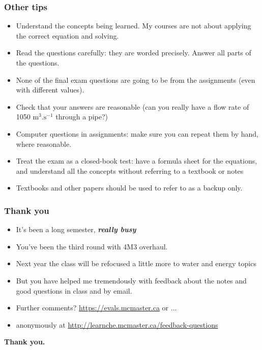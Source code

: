 \begin{frame}\frametitle{Other tips}
	\begin{itemize}
		\item	Understand the concepts being learned. My courses are not about applying the correct equation and solving.
		\item	Read the questions carefully: they are worded precisely. Answer all parts of the questions.
		\item	None of the final exam questions are going to be from the assignments (even with different values).
		\item	Check that your answers are reasonable (can you really have a flow rate of 1050 \(\text{m}^3.\text{s}^{-1}\) through a pipe?)
		\item	Computer questions in assignments: make sure you can repeat them by hand, where reasonable.
	\end{itemize}
	\begin{exampleblock}{{\color{myRed}{Most important advice}}}
		\begin{itemize}
			\item	Treat the exam as a closed-book test: have a formula sheet for the equations, and understand all the concepts without referring to a textbook or notes
			\item	Textbooks and other papers should be used to refer to as a backup only.
		\end{itemize}
	\end{exampleblock}
\end{frame}

\begin{frame}\frametitle{Thank you}
	\begin{itemize}
		\item	It's been a long semester, \textbf{\emph{really busy}}
		\item	You've been the third round with 4M3 overhaul.
		\item	Next year the class will be refocused a little more to water and energy topics
		\item	But you have helped me tremendously with feedback about the notes and good questions in class and by email.
		\item	Further comments? \href{https://evals.mcmaster.ca}{https://evals.mcmaster.ca} or ...
		\item	anonymously  at \href{http://learnche.mcmaster.ca/feedback-questions}{http://learnche.mcmaster.ca/feedback-questions}
	\end{itemize}
	\vspace{12pt}
	\textbf{Thank you.}
\end{frame}